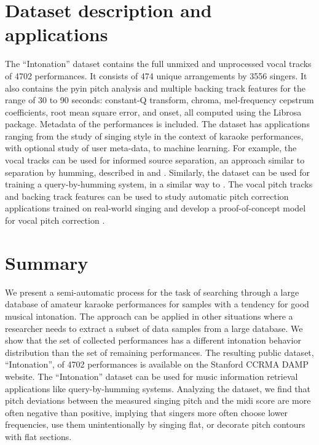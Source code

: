\section{Dataset description and applications}
The ``Intonation'' dataset contains the full unmixed and unprocessed vocal tracks of 4702 performances. It consists of 474 unique arrangements by 3556 singers. It also contains the \gls{pyin} pitch analysis and multiple backing track features for the range of 30 to 90 seconds: constant-Q transform, chroma, mel-frequency cepstrum coefficients, root mean square error, and onset, all computed using the Librosa \cite{mcfee2015librosa} package. Metadata of the performances is included. The dataset has applications ranging from the study of singing style in the context of karaoke performances, with optional study of user meta-data, to machine learning. For example, the vocal tracks can be used for informed source separation, an approach similar to separation by humming, described in \cite{smaragdis2009separation} and \cite{liutkus2012informed}. Similarly, the dataset can be used for training a query-by-humming system, in a similar way to \cite{huq2010crowdsourcing}. The vocal pitch tracks and backing track features can be used to study automatic pitch correction applications trained on real-world singing and develop a proof-of-concept model for vocal pitch correction \cite{wager2018pitch}.

\section{Summary}
We present a semi-automatic process for the task of searching through a large database of amateur karaoke performances for samples with a tendency for good musical intonation. The approach can be applied in other situations where a researcher needs to extract a subset of data samples from a large database. We show that the set of collected performances has a different intonation behavior distribution than the set of remaining performances. The resulting public dataset, ``Intonation'', of 4702 performances is available on the Stanford CCRMA DAMP website. The ``Intonation'' dataset can be used for music information retrieval applications like query-by-humming systems. Analyzing the dataset, we find that pitch deviations between the measured singing pitch and the \gls{midi} score are more often negative than positive, implying that singers more often choose lower frequencies, use them unintentionally by singing flat, or decorate pitch contours with flat sections.